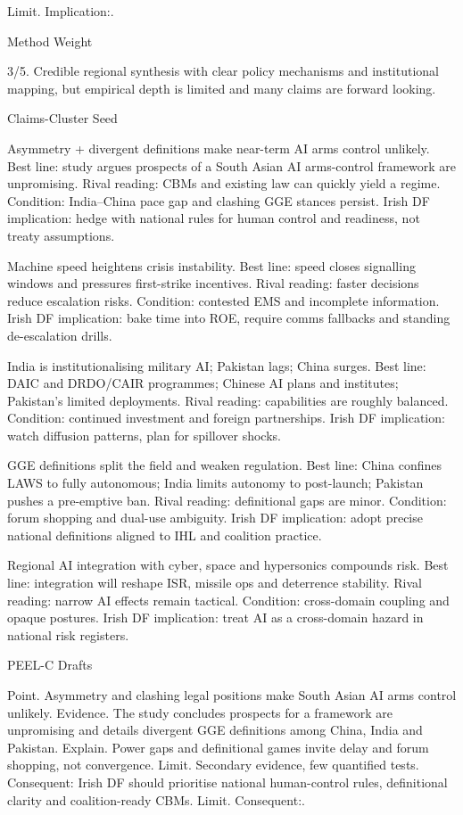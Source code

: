 Limit. Implication:.

Method Weight

3/5. Credible regional synthesis with clear policy mechanisms and institutional mapping, but empirical depth is limited and many claims are forward looking.

Claims-Cluster Seed

Asymmetry + divergent definitions make near-term AI arms control unlikely.
Best line: study argues prospects of a South Asian AI arms-control framework are unpromising.
Rival reading: CBMs and existing law can quickly yield a regime.
Condition: India–China pace gap and clashing GGE stances persist.
Irish DF implication: hedge with national rules for human control and readiness, not treaty assumptions.

Machine speed heightens crisis instability.
Best line: speed closes signalling windows and pressures first-strike incentives.
Rival reading: faster decisions reduce escalation risks.
Condition: contested EMS and incomplete information.
Irish DF implication: bake time into ROE, require comms fallbacks and standing de-escalation drills.

India is institutionalising military AI; Pakistan lags; China surges.
Best line: DAIC and DRDO/CAIR programmes; Chinese AI plans and institutes; Pakistan’s limited deployments.
Rival reading: capabilities are roughly balanced.
Condition: continued investment and foreign partnerships.
Irish DF implication: watch diffusion patterns, plan for spillover shocks.

GGE definitions split the field and weaken regulation.
Best line: China confines LAWS to fully autonomous; India limits autonomy to post-launch; Pakistan pushes a pre-emptive ban.
Rival reading: definitional gaps are minor.
Condition: forum shopping and dual-use ambiguity.
Irish DF implication: adopt precise national definitions aligned to IHL and coalition practice.

Regional AI integration with cyber, space and hypersonics compounds risk.
Best line: integration will reshape ISR, missile ops and deterrence stability.
Rival reading: narrow AI effects remain tactical.
Condition: cross-domain coupling and opaque postures.
Irish DF implication: treat AI as a cross-domain hazard in national risk registers.

PEEL-C Drafts

Point. Asymmetry and clashing legal positions make South Asian AI arms control unlikely.
Evidence. The study concludes prospects for a framework are unpromising and details divergent GGE definitions among China, India and Pakistan.
Explain. Power gaps and definitional games invite delay and forum shopping, not convergence.
Limit. Secondary evidence, few quantified tests. Consequent: Irish DF should prioritise national human-control rules, definitional clarity and coalition-ready CBMs. Limit. Consequent:.

